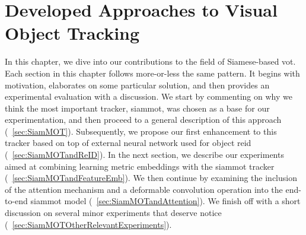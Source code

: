 \chapter{Developed Approaches to Visual Object Tracking}
\label{chap:DevelopedVisualTrackingApproaches}

In this chapter, we dive into our contributions to the field of Siamese-based \gls{vot}. Each section in this chapter follows more-or-less the same pattern. It begins with motivation, elaborates on some particular solution, and then provides an experimental evaluation with a discussion. We start by commenting on why we think the most important tracker, \gls{siammot}, was chosen as a base for our experimentation, and then proceed to a general description of this approach (\sectiontext{}~\ref{sec:SiamMOT}). Subsequently, we propose our first enhancement to this tracker based on top of external neural network used for object \gls{reid} (\sectiontext{}~\ref{sec:SiamMOTandReID}). In the next section, we describe our experiments aimed at combining learning metric embeddings with the \gls{siammot} tracker (\sectiontext{}~\ref{sec:SiamMOTandFeatureEmb}). We then continue by examining the inclusion of the attention mechanism and a deformable convolution operation into the end-to-end \gls{siammot} model (\sectiontext{}~\ref{sec:SiamMOTandAttention}). We finish off with a short discussion on several minor experiments that deserve notice (\sectiontext{}~\ref{sec:SiamMOTOtherRelevantExperiments}).






